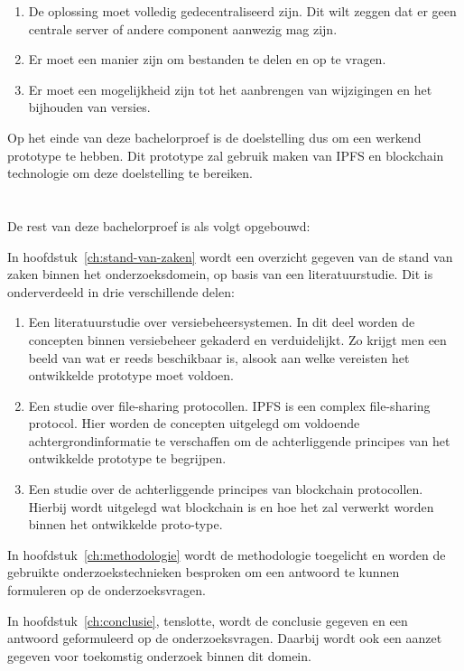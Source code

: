 \begin{enumerate}
 \item De oplossing moet volledig gedecentraliseerd zijn. Dit wilt zeggen dat er geen centrale server of andere component aanwezig mag zijn.\\
 \item Er moet een manier zijn om bestanden te delen en op te vragen.\\
 \item Er moet een mogelijkheid zijn tot het aanbrengen van wijzigingen en het bijhouden van versies.
\end{enumerate}

Op het einde van deze bachelorproef is de doelstelling dus om een werkend prototype te hebben. Dit prototype zal gebruik maken van IPFS en blockchain technologie om deze doelstelling te bereiken.

\section{}
\label{sec:opzet-bachelorproef}

De rest van deze bachelorproef is als volgt opgebouwd:

In hoofdstuk~\ref{ch:stand-van-zaken} wordt een overzicht gegeven van de stand van zaken binnen het onderzoeksdomein, op basis van een literatuurstudie. Dit is onderverdeeld in drie verschillende delen:

\begin{enumerate}
\item Een literatuurstudie over versiebeheersystemen. In dit deel worden de  concepten binnen versiebeheer gekaderd en verduidelijkt. Zo krijgt men een beeld van wat er reeds beschikbaar is, alsook aan welke vereisten het ontwikkelde prototype moet voldoen.\\
\item Een studie over file-sharing protocollen. IPFS is een complex file-sharing protocol. Hier worden de concepten uitgelegd om voldoende achtergrondinformatie te verschaffen om de achterliggende principes van het ontwikkelde prototype te begrijpen.\\
\item Een studie over de achterliggende principes van blockchain protocollen. Hierbij wordt uitgelegd wat blockchain is en hoe het zal verwerkt worden binnen het ontwikkelde proto-type.
\end{enumerate}

In hoofdstuk~\ref{ch:methodologie} wordt de methodologie toegelicht en worden de gebruikte onderzoekstechnieken besproken om een antwoord te kunnen formuleren op de onderzoeksvragen.

In hoofdstuk~\ref{ch:conclusie}, tenslotte, wordt de conclusie gegeven en een antwoord geformuleerd op de onderzoeksvragen. Daarbij wordt ook een aanzet gegeven voor toekomstig onderzoek binnen dit domein.